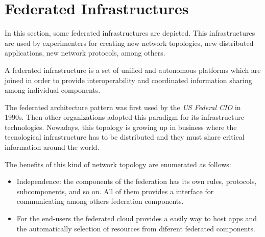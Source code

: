 \section{Federated Infrastructures}

In this section, some federated infrastructures are depicted. This
infrastructures are used by experimenters for creating new network topologies,
new distributed applications, new network protocols, among others.

A federated infrastructure is a set of unified and autonomous platforms which
are joined in order to provide interoperability and coordinated
information sharing among individual components. 

The federated architecture pattern was first used by the \emph{US Federal CIO} in
1990s. Then other organizations adopted this paradigm for its infrastructure
technologies. Nowadays, this topology is growing up in business where the
tecnological infrastructure has to be distributed and they must share critical
information around the world.

The benefits of this kind of network topology are enumerated as follows:
\begin{itemize}
\item Independence: the components of the federation has its own rules,
  protocols, subcomponents, and so on. All of them provides a interface for
  communicating among others federation components.
\item For the end-users the federated cloud provides a easily way to host apps
  and the automatically selection of resources from diferent federated components.
\end{itemize}

